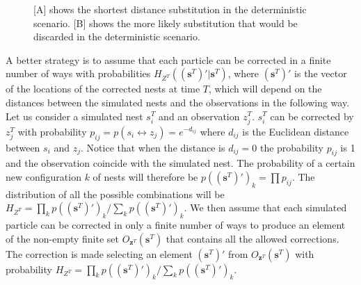 \documentclass[11pt,a4paper]{article}
\renewcommand{\vec}[1]{\mathbf{#1}}
\begin{document}
{\begin{figure}
\centering
\caption{[A] shows the shortest distance substitution in the deterministic scenario. [B] shows the more likely substitution that would be discarded in the deterministic scenario.}
\label{fig:1}
\end{figure}

A better strategy is to assume that each particle can be corrected in a finite number of ways with probabilities $H_{Z^T}((\vec{s}^T)' | \vec{s}^T)$, where $(\vec{s}^T)'$ is the vector of the locations of the corrected nests at time $T$, which will depend on the distances between the simulated nests and the observations in the following way. Let us consider a simulated nest $s^T_i$ and an observation $z^T_j$. $s^T_i$ can be corrected by $z^T_j$ with probability $p_{ij} = p(s_i \leftrightarrow z_j) = e^{-d_{ij}}$ where $d_{ij}$ is the Euclidean distance between $s_i$ and $z_j$. Notice that when the distance is $d_{ij} = 0$ the probability $p_{ij}$ is 1 and the observation coincide with the simulated nest. The probability of a certain new configuration $k$ of nests will therefore be $p((\vec{s}^T)')_k = \prod p_{ij}$. The distribution of all the possible combinations will be $H_{Z^T} = \prod_k p((\vec{s}^T)')_k / \sum_k p((\vec{s}^T)')_k $. We then assume that each simulated particle can be corrected in only a finite number of ways to produce an element of the non-empty finite set $O_{\vec{z}^T} (\vec{s}^T)$ that contains all the allowed corrections. The correction is made selecting an element $(\vec{s}^T)'$ from $O_{\vec{z}^T} (\vec{s}^T)$ with probability $H_{Z^T} = \prod_k p((\vec{s}^T)')_k / \sum_k p((\vec{s}^T)')_k$.

}
\end{document}
